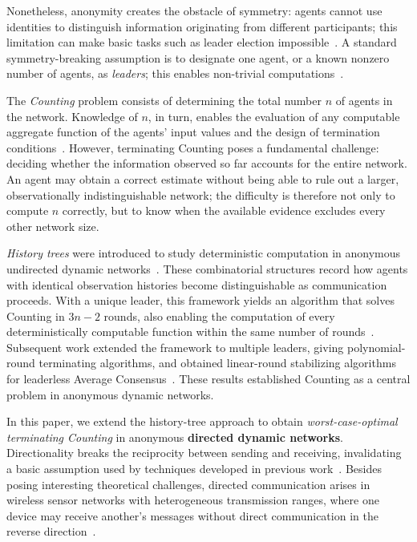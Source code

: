 \documentclass[11pt]{article}
\begin{document}
Nonetheless, anonymity creates the obstacle of symmetry: agents cannot use identities
to distinguish information originating from different participants; this limitation can make basic tasks such as leader election impossible~\cite{Angluin80}.
A standard symmetry-breaking assumption is to designate one agent, or a
known nonzero number of agents, as \emph{leaders}; this enables non-trivial computations~\cite{MCS13,DLV26}.

The \emph{Counting} problem consists of determining the total number \(n\) of agents in the network.
Knowledge of $n$, in turn, enables the evaluation of any computable aggregate function of the agents' input values and the design of termination conditions~\cite{KLO10}. However, terminating Counting poses a fundamental challenge: deciding
whether the information observed so far accounts for the entire network.
An agent may obtain a correct estimate without being able to rule out
a larger, observationally indistinguishable network; the difficulty is
therefore not only to compute $n$ correctly, but to know when the available evidence
excludes every other network size.

\emph{History trees} were introduced to study deterministic computation in anonymous undirected dynamic networks~\cite{DV22}. These combinatorial structures record how agents with identical observation histories become distinguishable as communication proceeds. With a unique leader, this framework yields an algorithm that solves Counting in \(3n-2\) rounds, also enabling the computation of every deterministically computable function within the same number of rounds~\cite{DV22}. Subsequent work extended the framework to multiple leaders, giving polynomial-round terminating algorithms, and obtained linear-round stabilizing algorithms for leaderless Average Consensus~\cite{DLV26}. These results established Counting as a central problem in anonymous dynamic networks.

In this paper, we extend the history-tree approach to obtain
\emph{worst-case-optimal terminating Counting} in anonymous {\bf directed dynamic
networks}. Directionality breaks the reciprocity between sending and receiving, invalidating a basic assumption used by techniques developed in previous work~\cite{DV22,DLV26}.
Besides posing interesting theoretical challenges, directed communication arises in wireless sensor networks with heterogeneous transmission ranges, where one device may receive another's messages without direct communication in the reverse direction~\cite{PS09}.
\end{document}
